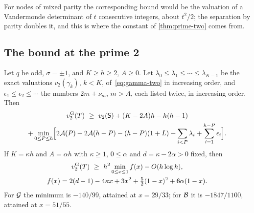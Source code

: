For nodes of mixed parity the corresponding bound would be the valuation of a Vandermonde
determinant of $t$ consecutive integers, about $t^2/2$; the separation by parity doubles it,
and this is where the constant of \cref{thm:prime-two} comes from.

\subsection{The bound at the prime 2}\label{subsec:two-bound}

\begin{theorem}\label{thm:prime-two}
Let $q$ be odd, $\sigma=\pm1$, and $K\ge h\ge2$, $A\ge0$. Let $\lambda_0\le\lambda_1\le\cdots\le\lambda_{K-1}$ be the exact valuations $v_2(\gamma_k)$, $k<K$, of~\eqref{eq:gamma-two} in increasing order, and $\epsilon_1\le\epsilon_2\le\cdots$ the numbers $2m+\nu_m$, $m>A$, each listed twice, in increasing order. Then
\begin{multline*}
  v_{2}^{\mathrm{G}}(T)\ \ge\ v_2(\mathsf{S})+(K-2A)h-h(h-1)\\
  +\min_{0\le P\le h}\Bigl[2\mathcal{A}(P)+2\mathcal{A}(h-P)-(h-P)(1+L)+\sum_{i<P}\lambda_i
  +\sum_{i=1}^{h-P}\epsilon_i\Bigr].
\end{multline*} If $K=\kappa h$ and $A=\alpha h$ with $\kappa\ge1$,
$0\le\alpha$ and $d=\kappa-2\alpha>0$ fixed, then
\begin{gather}
  v_{2}^{\mathrm{G}}(T)\ \ge\ h^2\min_{0\le x\le1}f(x)-O(h\log h),\label{eq:two-asymptotic}\\
  f(x)=2(d-1)-4\kappa x+3x^2+\tfrac52(1-x)^2+6\alpha(1-x).\notag
\end{gather}
For $\mathcal{G}$ the minimum is $-140/99$, attained at $x=29/33$; for $\mathcal{B}$ it is $-1847/1100$,
attained at $x=51/55$.
\end{theorem}

